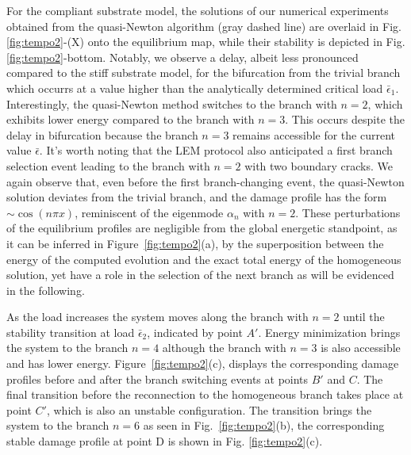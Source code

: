 For the compliant substrate model, the solutions of our numerical experiments obtained from the quasi-Newton algorithm (gray dashed line) are overlaid in Fig. \ref{fig:tempo2}-(X) onto the equilibrium map, while their stability is depicted in Fig. \ref{fig:tempo2}-bottom. Notably, we observe a delay, albeit less pronounced compared to the stiff substrate model, for the bifurcation from the trivial branch which occurrs at a value  higher than the analytically determined critical load \(\bar{\epsilon}_1\). Interestingly, the quasi-Newton method switches to the branch with $n=2$, which exhibits lower energy compared to the branch with $n=3$. This occurs  despite the delay in bifurcation because the branch  $n=3$ remains accessible for the current value $\bar\epsilon$. It's worth noting that the LEM protocol also anticipated a first branch selection event leading to the branch with $n=2$ with two boundary cracks. 
We again observe that, even before the first branch-changing event, the quasi-Newton solution {deviates from the trivial branch, and the damage profile has} the form \(\sim \cos(n\pi x)\), reminiscent of the eigenmode $\alpha_n$  with \(n=2\). 
These perturbations of the equilibrium profiles are negligible from the global energetic standpoint, as it can be inferred in Figure~\ref{fig:tempo2}(a), by the superposition between the energy of the computed evolution and the exact total energy of the homogeneous solution, yet have a role in the selection of the next branch as will be evidenced in the following.

As the load increases the system moves along the branch with $n=2$ until the stability transition at load $\bar \epsilon_2$, indicated by point $A'$. Energy minimization brings the system to the branch $n=4$ although the branch with $n=3$ is also accessible and has lower energy. Figure~\ref{fig:tempo2}(c), displays the corresponding damage profiles before and after {the branch} switching events  at points $B'$ and $C$. The final {transition} before the reconnection to the homogeneous branch takes place at point $C'$, which is also an unstable configuration. The transition brings the system to the branch $n=6$ as seen in Fig.~\ref{fig:tempo2}(b), the corresponding stable damage profile at point D is shown in Fig. \ref{fig:tempo2}(c). 

